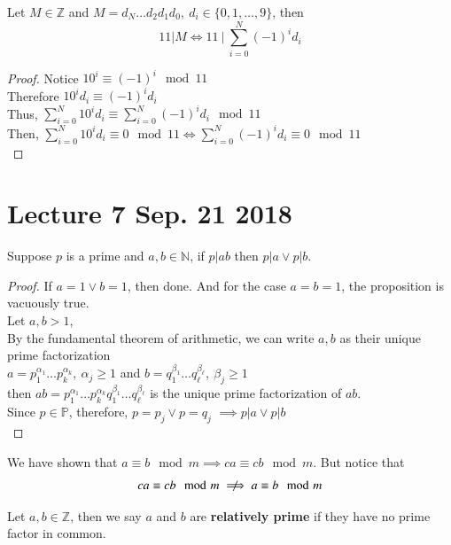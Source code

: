 \documentclass[11pt]{article}
\begin{document}
	\begin{theorem}
		Let $M \in \mathbb{Z}$ and $M = d_N \dots d_2 d_1 d_0,\ d_i \in \{0,1,\dots,9\}$, then 
		\[
			11 | M \iff 11\ |\ \sum_{i=0}^N{(-1)^i d_i}
		\]
	\end{theorem}
	
	\begin{proof}
		Notice $10^i \equiv (-1)^i \mod 11$ \\
		Therefore $10^i d_i \equiv (-1)^i d_i$ \\
		Thus, $\sum_{i=0}^N{10^i d_i} \equiv \sum_{i=0}^N{(-1)^i d_i} \mod 11$ \\
		Then, $\sum_{i=0}^N{10^i d_i} \equiv 0 \mod 11 \iff \sum_{i=0}^N{(-1)^i d_i} \equiv 0 \mod 11$ \\
	\end{proof}
	
	\section{Lecture 7 Sep. 21 2018}
	\begin{theorem}
		Suppose $p$ is a prime and $a,b \in \mathbb{N}$, if $p|ab$ then $p | a \lor p | b$.
	\end{theorem}
	\begin{proof}
		If $a = 1 \lor b = 1$, then done. And for the case $a = b = 1$, the proposition is vacuously true.\\
		Let $a, b > 1$, \\
		By the fundamental theorem of arithmetic, we can write $a, b $ as their unique prime factorization \\
		$a = p_1^{\alpha_1} \dots p_k^{\alpha_k},\ \alpha_j \geq 1$ and $b = q_1^{\beta_1}\dots q_\ell^{\beta_\ell},\ \beta_j \geq 1$\\
		then $ab = p_1^{\alpha_1} \dots p_k^{\alpha_k}q_1^{\beta_1}\dots q_\ell^{\beta_\ell}$ is the unique prime factorization of $ab$. \\
		Since $p \in \mathbb{P}$, therefore, $p=p_j \lor p = q_j$ 
		$\implies p | a \lor p | b$ \\
	\end{proof}
	
	\begin{remark}
		We have shown that $a \equiv b \mod m \implies ca \equiv cb \mod m$. But notice that 
		\[
			ca \equiv cb \mod m \centernot \implies a \equiv b \mod m
		\]
	\end{remark}
	
	\begin{definition}
		Let $a,b \in \mathbb{Z}$, then we say $a$ and $b$ are \textbf{relatively prime} if they have no prime factor in common.
	\end{definition}
	
\end{document}
